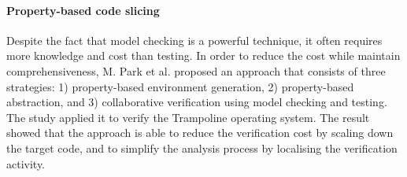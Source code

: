 
\paragraph{Property-based code slicing}
Despite the fact that model checking is a powerful technique, it often requires more knowledge and cost than testing. In order to reduce the cost while maintain comprehensiveness, M. Park et al. \cite{DBLP:journals/corr/abs-1301-0042} proposed an approach that consists of three strategies: 1) property-based environment generation, 2) property-based abstraction, and 3) collaborative verification using model checking and testing. The study applied it to verify the Trampoline operating system. The result showed that the approach is able to reduce the verification cost by scaling down the target code, and to simplify the analysis process by localising the verification activity.





